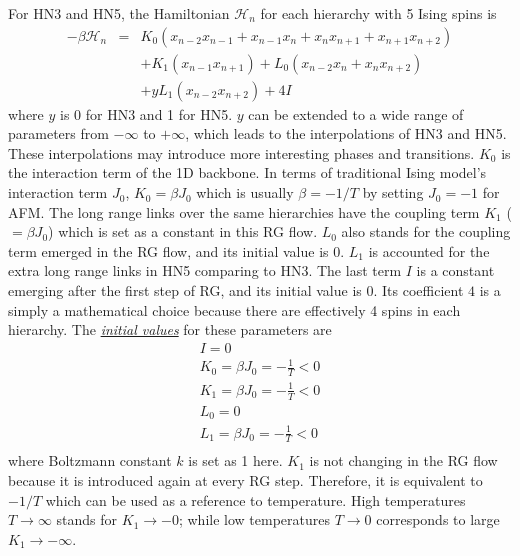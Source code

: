 For HN3 and HN5, the Hamiltonian $\mathcal{H}_n$ for each hierarchy with 5 Ising spins is
\begin{eqnarray}
\label{eq:hn35-z0}
 -\beta \mathcal{H}_n &=& K_0 \left(x_{n-2}x_{n-1} + x_{n-1}x_{n} +  x_{n}x_{n+1} +  x_{n+1}x_{n+2}\right) \nonumber \\ 
   && + K_1(x_{n-1}x_{n+1}) + L_0(x_{n-2}x_{n} + x_{n}x_{n+2}) \nonumber \\
   && + y L_1 (x_{n-2} x_{n+2})  + 4I 
\end{eqnarray}
where $y$ is 0 for HN3 and 1 for HN5. $y$ can be extended to a wide range of parameters from $-\infty$ to $+\infty$, which leads to the interpolations of HN3 and HN5. These interpolations may introduce more interesting phases and transitions. $K_0$ is the interaction term of the 1D backbone. In terms of traditional Ising model's interaction term $J_0$, $K_0=\beta J_0$ which is usually $\beta=-1/T$ by setting $J_0=-1$ for AFM. The long range links over the same hierarchies have the coupling term $K_1$ ($=\beta J_0$) which is set as a constant in this RG flow. $L_0$ also stands for the coupling term emerged in the RG flow, and its initial value is 0. $L_1$ is accounted for the extra long range links in HN5 comparing to HN3. The last term $I$ is a constant emerging after the first step of RG, and its initial value is 0. Its coefficient $4$ is a simply a mathematical choice because there are effectively 4 spins in each hierarchy. The \underline{\emph{initial values}} for these parameters are
\begin{equation}
\begin{array}{l}
\displaystyle I = 0 \\
\displaystyle K_0 =\beta J_0=-\frac{1}{T} < 0 \\
\displaystyle K_1 =\beta J_0=-\frac{1}{T}  < 0 \\
\displaystyle L_0 = 0 \\
\displaystyle L_1 =\beta J_0 =-\frac{1}{T} < 0 \\
\end{array} 
\label{eq:hn35-init1}
\end{equation}
where Boltzmann constant $k$ is set as 1 here. $K_1$ is not changing in the RG flow because it is introduced again at every RG step. Therefore, it is equivalent to $-1/T$ which can be used as a reference to temperature. High temperatures $T \rightarrow \infty$ stands for $K_1\rightarrow -0$; while low temperatures $T\rightarrow 0$ corresponds to large $K_1 \rightarrow -\infty$.

